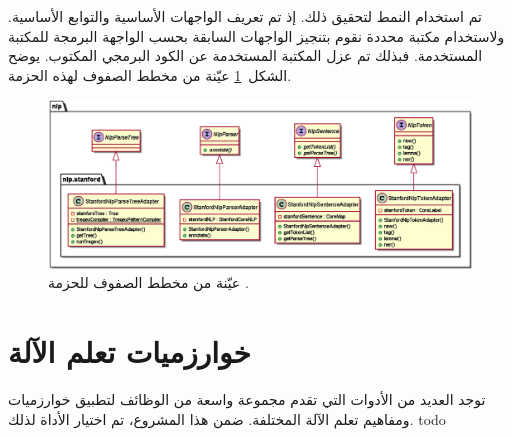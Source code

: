 تم استخدام النمط  لتحقيق ذلك.
إذ تم تعريف الواجهات الأساسية والتوابع الأساسية.
ولاستخدام مكتبة محددة نقوم بتنجيز الواجهات السابقة بحسب الواجهة البرمجة  للمكتبة المستخدمة.
فبذلك تم عزل المكتبة المستخدمة عن الكود البرمجي المكتوب.
يوضح الشكل~\ref{fig:cd:nlp} عيّنة من مخطط الصفوف لهذه الحزمة.

\begin{figure}[htb]
	\centering
	\includegraphics[width=1\linewidth]{images/cd-nlp.eps}
	\caption{%
		عيّنة من مخطط الصفوف للحزمة .
	}
	\label{fig:cd:nlp}
\end{figure}

\afterpage{\clearpage}



\section{خوارزميات تعلم الآلة}
توجد العديد من الأدوات  التي تقدم مجموعة واسعة من الوظائف لتطبيق خوارزميات ومفاهيم تعلم الآلة المختلفة.
ضمن هذا المشروع، تم اختيار الأداة  لذلك.
todo





